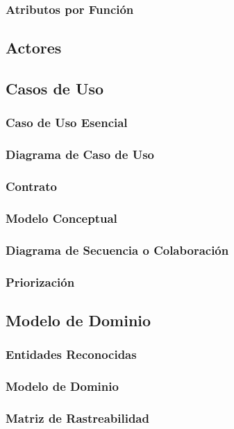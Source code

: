 \subsubsection{Atributos por Función}

\newpage
\subsection{Actores}

\subsection{Casos de Uso}
\subsubsection{Caso de Uso Esencial}
\subsubsection{Diagrama de Caso de Uso}
\subsubsection{Contrato}
\subsubsection{Modelo Conceptual}
\subsubsection{Diagrama de Secuencia o Colaboración}
\subsubsection{Priorización}

\subsection{Modelo de Dominio}
\subsubsection{Entidades Reconocidas}
\subsubsection{Modelo de Dominio}
\subsubsection{Matriz de Rastreabilidad}